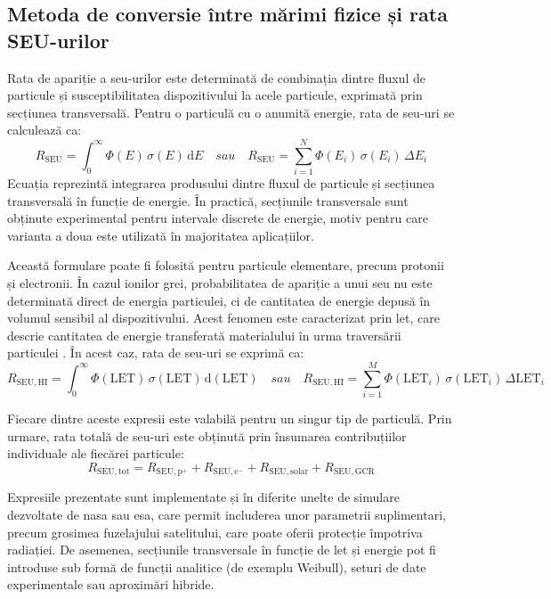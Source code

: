 \documentclass[12pt,a4paper]{report}
\begin{document}
\subsection{Metoda de conversie între mărimi fizice și rata SEU-urilor}
Rata de apariție a \gls{seu}-urilor este determinată de combinația dintre fluxul de particule și susceptibilitatea dispozitivului la acele particule, exprimată prin secțiunea transversală. Pentru o particulă cu o anumită energie, rata de \gls{seu}-uri se calculează ca:
\begin{equation}
R_{\mathrm{SEU}} =
\int_{0}^{\infty} \Phi(E)\,\sigma(E)\,\mathrm{d}E
\quad sau \quad 
R_{\mathrm{SEU}} =
\sum_{i=1}^{N}
\Phi(E_i)\,
\sigma(E_i)\,
\Delta E_i
\end{equation}
Ecuația reprezintă integrarea produsului dintre fluxul de particule și secțiunea transversală în funcție de energie. În practică, secțiunile transversale sunt obținute experimental pentru intervale discrete de energie, motiv pentru care varianta a doua este utilizată în majoritatea aplicațiilor.

Această formulare poate fi folosită pentru particule elementare, precum protonii și electronii. În cazul ionilor grei, probabilitatea de apariție a unui \gls{seu} nu este determinată direct de energia particulei, ci de cantitatea de energie depusă în volumul sensibil al dispozitivului. Acest fenomen este caracterizat prin \gls{let}, care descrie cantitatea de energie transferată materialului în urma traversării particulei \cite{space_radiation_enviroment}. În acest caz, rata de \gls{seu}-uri se exprimă ca:
\begin{equation}
R_{\mathrm{SEU},\mathrm{HI}} =
\int_{0}^{\infty}
\Phi(\mathrm{LET})\,
\sigma(\mathrm{LET})\,
\mathrm{d}(\mathrm{LET})
\quad sau \quad 
R_{\mathrm{SEU},\mathrm{HI}} =
\sum_{i=1}^{M}
\Phi(\mathrm{LET}_i)\,
\sigma(\mathrm{LET}_i)\,
\Delta \mathrm{LET}_i
\end{equation}

Fiecare dintre aceste expresii este valabilă pentru un singur tip de particulă. Prin urmare, rata totală de \gls{seu}-uri este obținută prin însumarea contribuțiilor individuale ale fiecărei particule:
\begin{equation}
R_{\mathrm{SEU,tot}} = R_{\mathrm{SEU, p^+}} + R_{\mathrm{SEU, e^-}} + R_{\mathrm{SEU, solar}} + R_{\mathrm{SEU, GCR}}
\end{equation}

Expresiile prezentate sunt implementate și în diferite unelte de simulare dezvoltate de \gls{nasa} sau \gls{esa}, care permit includerea unor parametrii suplimentari, precum grosimea fuzelajului satelitului, care poate oferii protecție împotriva radiației. De asemenea, secțiunile transversale în funcție de \gls{let} și energie pot fi introduse sub formă de funcții analitice (de exemplu Weibull), seturi de date experimentale sau aproximări hibride.
\end{document}
